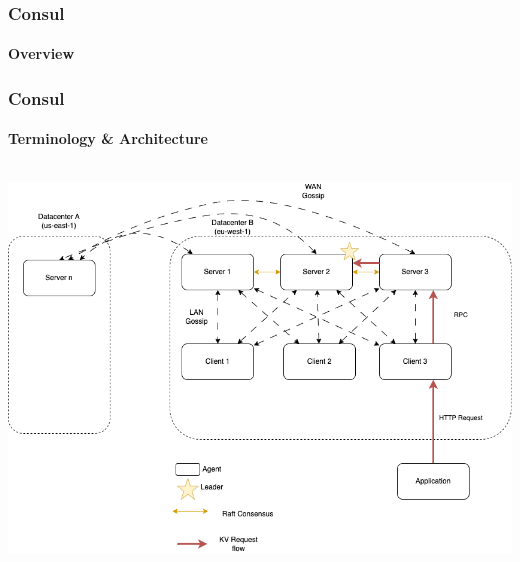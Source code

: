 



\begin{frame}
	\frametitle{Consul}
	\framesubtitle{Overview}
\end{frame}

\begin{frame}[shrink]
	\frametitle{Consul}
	\framesubtitle{Terminology \& Architecture}
	\begin{columns}[T]
		\begin{column}{0.7\textwidth}
			\includegraphics{assets/consul_architecture.png}
		\end{column}
	\end{columns}
\end{frame}


